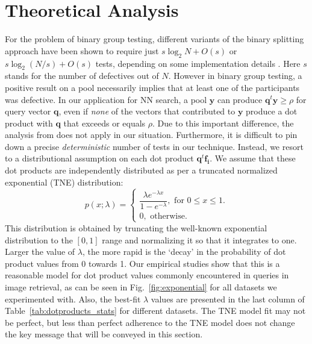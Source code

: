 \documentclass[sigconf, anonymous, review]{acmart}
\begin{document}
\section{Theoretical Analysis}
\label{sec:theoretical_analysis}
For the problem of binary group testing, different variants of the binary splitting approach have been shown to require just $s \log_2 N + O(s)$ or $s \log_2 (N/s) + O(s)$ tests, depending on some implementation details \cite[Theorems 1.2 and 1.3]{Aldridge2019}. Here $s$ stands for the number of defectives out of $N$. However in binary group testing, a positive result on a pool necessarily implies that at least one of the participants was defective. In our application for NN search, a pool $\boldsymbol{y}$ can produce $\boldsymbol{q}^t \boldsymbol{y} \geq \rho$ for query vector $\boldsymbol{q}$, even if \emph{none} of the vectors that contributed to $\boldsymbol{y}$ produce a dot product with $\boldsymbol{q}$ that exceeds or equals $\rho$. Due to this important difference, the analysis from \cite{Aldridge2019} does not apply in our situation. Furthermore, it is difficult to pin down a precise \emph{deterministic} number of tests in our technique. Instead, we resort to a distributional assumption on each dot product $\boldsymbol{q}^t \boldsymbol{f_i}$. We assume that these dot products are independently distributed as per a truncated normalized exponential (TNE) distribution:
\begin{equation}
p(x; \lambda) = 
\begin{cases}
\dfrac{\lambda e^{-\lambda x}}{1-e^{-\lambda}}, \textrm{ for } 0 \leq x \leq 1. \\
0, \textrm{ otherwise.}
\end{cases}
\label{eq:TNE}
\end{equation}
This distribution is obtained by truncating the well-known exponential distribution to the $[0,1]$ range and normalizing it so that it integrates to one. Larger the value of $\lambda$, the more rapid is the `decay' in the probability of dot product values from 0 towards 1. Our empirical studies show that this is a reasonable model for dot product values commonly encountered in queries in image retrieval, as can be seen in Fig.~\ref{fig:exponential} for all datasets we experimented with. Also, the best-fit $\lambda$ values are presented in the last column of Table~\ref{tab:dotproducts_stats} for different datasets. The TNE model fit may not be perfect, but less than perfect adherence to the TNE model does not change the key message that will be conveyed in this section.
\end{document}
